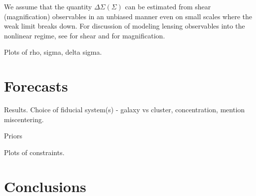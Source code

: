 \documentclass[12pt]{emulateapj}
\begin{document}
We assume that the quantity $\Delta\Sigma (\Sigma)$ can be estimated
from shear (magnification) observables in an unbiased manner even on
small scales where the weak limit breaks down. For discussion of
modeling lensing observables into the nonlinear regime, see \citet{}
for shear and \citet{Menard2003, Takada2003} for magnification.

Plots of rho, sigma, delta sigma.

\section{Forecasts}

Results. Choice of fiducial system(s) - galaxy vs cluster, concentration, mention
miscentering.

Priors

Plots of constraints.

\section{Conclusions}



\acknowledgments 

\mbox{~} %


%



\end{document}
